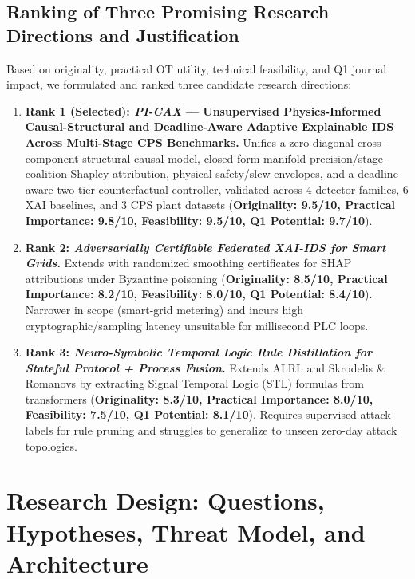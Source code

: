 \documentclass[10pt,a4paper]{article}
\begin{document}
\subsection{Ranking of Three Promising Research Directions and Justification}

Based on originality, practical OT utility, technical feasibility, and Q1 journal impact, we formulated and ranked three candidate research directions:
\begin{enumerate}\setlength{\itemsep}{2pt}\setlength{\parskip}{0pt}
    \item \textbf{Rank 1 (Selected): \emph{PI-CAX} --- Unsupervised Physics-Informed Causal-Structural and Deadline-Aware Adaptive Explainable IDS Across Multi-Stage CPS Benchmarks.} Unifies a zero-diagonal cross-component structural causal model, closed-form manifold precision/stage-coalition Shapley attribution, physical safety/slew envelopes, and a deadline-aware two-tier counterfactual controller, validated across 4 detector families, 6 XAI baselines, and 3 CPS plant datasets (\textbf{Originality: 9.5/10, Practical Importance: 9.8/10, Feasibility: 9.5/10, Q1 Potential: 9.7/10}).
    \item \textbf{Rank 2: \emph{Adversarially Certifiable Federated XAI-IDS for Smart Grids}.} Extends \cite{yazdinejad2025tcss, elgarhy2025jiot} with randomized smoothing certificates for SHAP attributions under Byzantine poisoning (\textbf{Originality: 8.5/10, Practical Importance: 8.2/10, Feasibility: 8.0/10, Q1 Potential: 8.4/10}). Narrower in scope (smart-grid metering) and incurs high cryptographic/sampling latency unsuitable for millisecond PLC loops.
    \item \textbf{Rank 3: \emph{Neuro-Symbolic Temporal Logic Rule Distillation for Stateful Protocol + Process Fusion}.} Extends ALRL \cite{xu2024alrl} and Skrodelis \& Romanovs \cite{skrodelis2026review} by extracting Signal Temporal Logic (STL) formulas from transformers (\textbf{Originality: 8.3/10, Practical Importance: 8.0/10, Feasibility: 7.5/10, Q1 Potential: 8.1/10}). Requires supervised attack labels for rule pruning and struggles to generalize to unseen zero-day attack topologies.
\end{enumerate}

\section{Research Design: Questions, Hypotheses, Threat Model, and Architecture}
\end{document}
